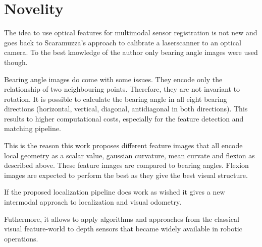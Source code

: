 \documentclass[doktyp=marbeit,fontsize=12pt,sprache=english,draft=true,hausschrift=true,fleqn]{TUBAFarbeiten}
\begin{document}
\section{Novelity}\label{novelity}

The idea to use optical features for multimodal sensor registration is
not new and goes back to Scaramuzza's approach to calibrate a
laserscanner to an optical camera. To the best knowledge of the author
only bearing angle images were used though.

Bearing angle images do come with some issues. They encode only the
relationship of two neighbouring points. Therefore, they are not
invariant to rotation. It is possible to calculate the bearing angle in
all eight bearing directions (horizontal, vertical, diagonal, antidiagonal in
both directions). This results to higher computational costs, especially
for the feature detection and matching pipeline.

This is the reason this work proposes different feature images that all
encode local geometry as a scalar value, gaussian curvature, mean
curvate and flexion as described above. These feature images are
compared to bearing angles. Flexion images are expected to perform the best
as they give the best visual structure.

If the proposed localization pipeline does work as wished it gives a new
intermodal approach to localization and visual odometry.

Futhermore, it allows to apply algorithms and approaches from the
classical visual feature-world to depth sensors that became widely
available in robotic operations.

% 
%
% 
% 
% 
% 
% 
% 
% 

\begin{appendix}
    \newpage

    
    

    \newpage
    \listoftables

    \newpage
    \listoffigures

\end{appendix}
\end{document}
